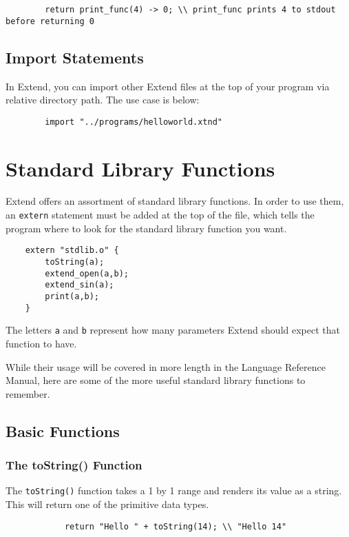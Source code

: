 	\begin{lstlisting}
		return print_func(4) -> 0; \\ print_func prints 4 to stdout before returning 0
	\end{lstlisting}

	\subsection{Import Statements}
	In Extend, you can import other Extend files at the top of your program via relative directory path. The use case is below:

	\begin{lstlisting}
		import "../programs/helloworld.xtnd"
	\end{lstlisting}

\section{Standard Library Functions}
Extend offers an assortment of standard library functions. In order to use them, an \texttt{extern} statement must be added at the top of the file, which tells the program where to look for the standard library function you want.

\begin{lstlisting}
	extern "stdlib.o" {
		toString(a);
		extend_open(a,b);
		extend_sin(a);
		print(a,b);
	}
\end{lstlisting}

\medskip \noindent
The letters \texttt{a} and \texttt{b} represent how many parameters Extend should expect that function to have.

While their usage will be covered in more length in the Language Reference Manual, here are some of the more useful standard library functions to remember.
	\subsection{Basic Functions}
		\subsubsection{The toString() Function}
		The \texttt{toString()} function takes a 1 by 1 range and renders its value as a string. This will return one of the primitive data types.

		\begin{lstlisting}
			return "Hello " + toString(14); \\ "Hello 14"
		\end{lstlisting}


